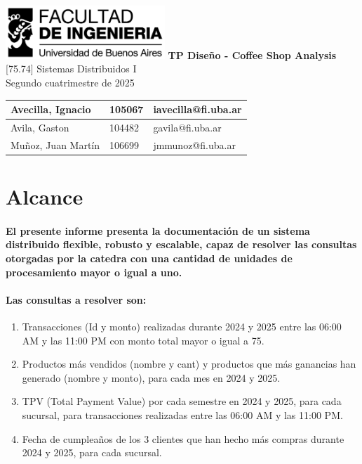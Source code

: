 \documentclass[titlepage,a4paper]{article}
\begin{document}
\begin{titlepage} %
	\hfill\includegraphics[width=6cm]{logofiuba.jpg}
    \centering
    \vfill
    \Huge \textbf{TP Diseño - Coffee Shop Analysis}
    \vskip2cm
    \Large [75.74] Sistemas Distribuidos I\\
    Segundo cuatrimestre de 2025 
    \vfill
    \begin{tabular}{ | l | l | l |}
      \hline
      Avecilla, Ignacio & 105067& iavecilla@fi.uba.ar\\ \hline
      Avila, Gaston& 104482& gavila@fi.uba.ar\\ \hline
      Muñoz, Juan Martín & 106699& jmmunoz@fi.uba.ar\\ \hline
  	\end{tabular}
    \vfill
    \vfill
\end{titlepage}

\tableofcontents %
\newpage

\section{Alcance}\label{sec:alcance}
\paragraph{El presente informe presenta la documentación de un sistema distribuido flexible, robusto y escalable, capaz de resolver las consultas otorgadas por la catedra con una cantidad de unidades de procesamiento mayor o igual a uno.}

\paragraph{Las consultas a resolver son:}
\begin{enumerate}
    \item Transacciones (Id y monto) realizadas durante 2024 y 2025 entre las 06:00 AM y las
11:00 PM con monto total mayor o igual a 75.
\item Productos más vendidos (nombre y cant) y productos que más ganancias han generado
(nombre y monto), para cada mes en 2024 y 2025.
\item TPV (Total Payment Value) por cada semestre en 2024 y 2025, para cada sucursal, para
transacciones realizadas entre las 06:00 AM y las 11:00 PM.
\item Fecha de cumpleaños de los 3 clientes que han hecho más compras durante 2024 y
2025, para cada sucursal.
\end{enumerate}
\end{document}
